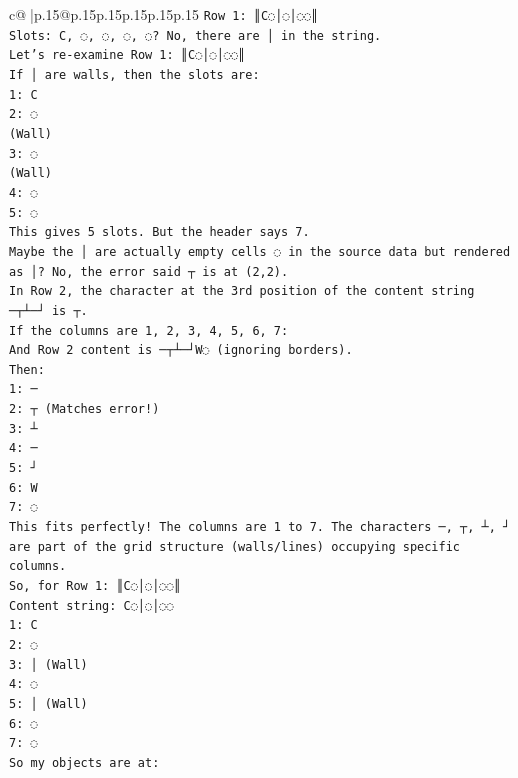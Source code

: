 \documentclass{article}
\begin{document}
{\begin{supertabular}{c@{$\;$}|p{.15\linewidth}@{}p{.15\linewidth}p{.15\linewidth}p{.15\linewidth}p{.15\linewidth}p{.15\linewidth}}
{{{\texttt{Row 1: ║C◌│◌│◌◌║} \\
\texttt{Slots: C, ◌, ◌, ◌, ◌? No, there are │ in the string.} \\
\texttt{Let's re{-}examine Row 1: ║C◌│◌│◌◌║} \\
\texttt{If │ are walls, then the slots are:} \\
\texttt{1: C} \\
\texttt{2: ◌} \\
\texttt{(Wall)} \\
\texttt{3: ◌} \\
\texttt{(Wall)} \\
\texttt{4: ◌} \\
\texttt{5: ◌} \\
\texttt{This gives 5 slots. But the header says 7.} \\
\texttt{Maybe the │ are actually empty cells ◌ in the source data but rendered as │? No, the error said ┬ is at (2,2).} \\
\texttt{In Row 2, the character at the 3rd position of the content string ─┬┴─┘ is ┬.} \\
\texttt{If the columns are 1, 2, 3, 4, 5, 6, 7:} \\
\texttt{And Row 2 content is ─┬┴─┘W◌ (ignoring borders).} \\
\texttt{Then:} \\
\texttt{1: ─} \\
\texttt{2: ┬ (Matches error!)} \\
\texttt{3: ┴} \\
\texttt{4: ─} \\
\texttt{5: ┘} \\
\texttt{6: W} \\
\texttt{7: ◌} \\
\texttt{This fits perfectly! The columns are 1 to 7. The characters ─, ┬, ┴, ┘ are part of the grid structure (walls/lines) occupying specific columns.} \\
\texttt{So, for Row 1: ║C◌│◌│◌◌║} \\
\texttt{Content string: C◌│◌│◌◌} \\
\texttt{1: C} \\
\texttt{2: ◌} \\
\texttt{3: │ (Wall)} \\
\texttt{4: ◌} \\
\texttt{5: │ (Wall)} \\
\texttt{6: ◌} \\
\texttt{7: ◌} \\
\texttt{So my objects are at:} \\
}}}
\end{supertabular}}
\end{document}
